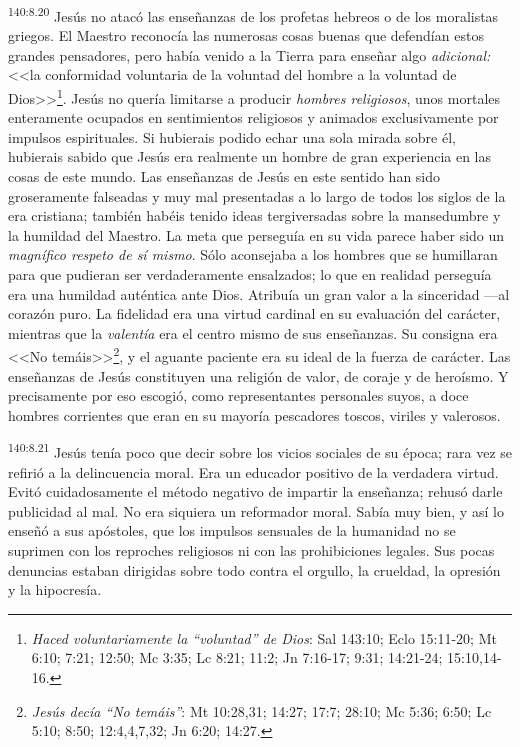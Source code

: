 \par 
\textsuperscript{140:8.20} Jesús no atacó las enseñanzas de los profetas hebreos o de los moralistas griegos. El Maestro reconocía las numerosas cosas buenas que defendían estos grandes pensadores, pero había venido a la Tierra para enseñar algo \textit{adicional:} <<la conformidad voluntaria de la voluntad del hombre a la voluntad de Dios>>\footnote{\textit{Haced voluntariamente la ``voluntad'' de Dios}: Sal 143:10; Eclo 15:11-20; Mt 6:10; 7:21; 12:50; Mc 3:35; Lc 8:21; 11:2; Jn 7:16-17; 9:31; 14:21-24; 15:10,14-16.}. Jesús no quería limitarse a producir \textit{hombres religiosos}, unos mortales enteramente ocupados en sentimientos religiosos y animados exclusivamente por impulsos espirituales. Si hubierais podido echar una sola mirada sobre él, hubierais sabido que Jesús era realmente un hombre de gran experiencia en las cosas de este mundo. Las enseñanzas de Jesús en este sentido han sido groseramente falseadas y muy mal presentadas a lo largo de todos los siglos de la era cristiana; también habéis tenido ideas tergiversadas sobre la mansedumbre y la humildad del Maestro. La meta que perseguía en su vida parece haber sido un \textit{magnífico respeto de sí mismo}. Sólo aconsejaba a los hombres que se humillaran para que pudieran ser verdaderamente ensalzados; lo que en realidad perseguía era una humildad auténtica ante Dios. Atribuía un gran valor a la sinceridad ---al corazón puro. La fidelidad era una virtud cardinal en su evaluación del carácter, mientras que la \textit{valentía} era el centro mismo de sus enseñanzas. Su consigna era <<No temáis>>\footnote{\textit{Jesús decía ``No temáis''}: Mt 10:28,31; 14:27; 17:7; 28:10; Mc 5:36; 6:50; Lc 5:10; 8:50; 12:4,4,7,32; Jn 6:20; 14:27.}, y el aguante paciente era su ideal de la fuerza de carácter. Las enseñanzas de Jesús constituyen una religión de valor, de coraje y de heroísmo. Y precisamente por eso escogió, como representantes personales suyos, a doce hombres corrientes que eran en su mayoría pescadores toscos, viriles y valerosos.

\par 
\textsuperscript{140:8.21} Jesús tenía poco que decir sobre los vicios sociales de su época; rara vez se refirió a la delincuencia moral. Era un educador positivo de la verdadera virtud. Evitó cuidadosamente el método negativo de impartir la enseñanza; rehusó darle publicidad al mal. No era siquiera un reformador moral. Sabía muy bien, y así lo enseñó a sus apóstoles, que los impulsos sensuales de la humanidad no se suprimen con los reproches religiosos ni con las prohibiciones legales. Sus pocas denuncias estaban dirigidas sobre todo contra el orgullo, la crueldad, la opresión y la hipocresía.

